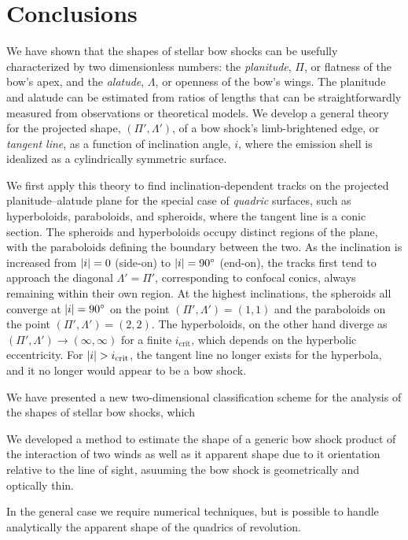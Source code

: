 \section{Conclusions}
\label{sec:conc}

We have shown that the shapes of stellar bow shocks can be usefully
characterized by two dimensionless numbers: the \textit{planitude},
\(\Pi\), or flatness of the bow's apex, and the \textit{alatude},
\(\Lambda\), or openness of the bow's wings.  The planitude and alatude can
be estimated from ratios of lengths that can be straightforwardly
measured from observations or theoretical models.  We develop a
general theory for the projected shape, \((\Pi', \Lambda')\), of a bow shock's
limb-brightened edge, or \textit{tangent line}, as a function of
inclination angle, \(i\), where the emission shell is idealized as a
cylindrically symmetric surface.

We first apply this theory to find inclination-dependent tracks on the
projected planitude--alatude plane for the special case of
\textit{quadric} surfaces, such as hyperboloids, paraboloids, and
spheroids, where the tangent line is a conic section.  The spheroids
and hyperboloids occupy distinct regions of the plane, with the
paraboloids defining the boundary between the two.  As the inclination
is increased from \(\lvert i\rvert = 0\) (side-on) to \(\lvert i\rvert = 90^\circ\)
(end-on), the tracks first tend to approach the diagonal
\(\Lambda' = \Pi'\), corresponding to confocal conics, always remaining within
their own region.  At the highest inclinations, the spheroids all
converge at \(\lvert i\rvert = 90^\circ\) on the point
\((\Pi', \Lambda') = (1, 1)\) and the paraboloids on the point
\((\Pi', \Lambda') = (2, 2)\).  The hyperboloids, on the other hand diverge as
\((\Pi', \Lambda') \to (\infty, \infty)\) for a finite
\(i_{\mathrm{crit}}\), which depends on the hyperbolic eccentricity.
For \(\lvert i\rvert > i_{\mathrm{crit}}\), the tangent line no longer exists
for the hyperbola, and it no longer would appear to be a bow shock.



We have presented a new two-dimensional classification scheme for the
analysis of the shapes of stellar bow shocks, which 


We developed a method to estimate the shape of a generic bow shock product of the
interaction of two winds as well as it apparent shape due to it orientation relative to the line of sight, asuuming
the bow shock is geometrically and optically thin.

In the general case we require numerical techniques, but is possible to handle analytically the apparent shape of
the quadrics of revolution. 

